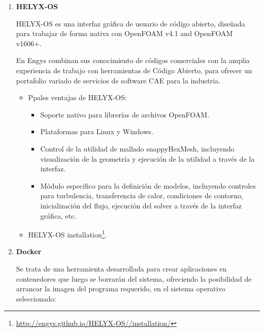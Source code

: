 \begin{enumerate}
\def\labelenumi{\arabic{enumi}.}
\item
  \textbf{HELYX-OS} \cite{helyxos}

HELYX-OS es una interfaz gráfica de usuario de código abierto, diseñada
para trabajar de forma nativa con OpenFOAM v4.1 and OpenFOAM v1606+.

En Engys combinan sus conocimiento de códigos comerciales con la amplia
experiencia de trabajo con herramientas de Código Abierto, para ofrecer
un portafolio variado de servicios de software CAE para la industria.

\begin{itemize}
\item
  Ppales ventajas de
  HELYX-OS:

  \begin{itemize}
  \item
    Soporte nativo para librerías de archivos OpenFOAM.
  \item
    Plataformas para Linux y Windows.
  \item
    Control de la utilidad de mallado snappyHexMesh, incluyendo
    visualización de la geometría y ejecución de la utilidad a través de
    la interfaz.
  \item
    Módulo específico para la definición de modelos, incluyendo
    controles para turbulencia, transferencia de calor, condiciones de
    contorno, inicialización del flujo, ejecución del solver a través de
    la interfaz gráfica, etc.
  \end{itemize}
\item
  HELYX-OS
  installation\footnote{\url{http://engys.github.io/HELYX-OS//installation/}}.

\end{itemize}

\item
  \textbf{Docker} \cite{docker}

Se trata de una herramienta desarrollada para crear aplicaciones en
contenedores que luego se borrarán del sistema, ofreciendo la
posibilidad de arrancar la imagen del programa requerido, en el sistema
operativo seleccionado:


\end{enumerate}
